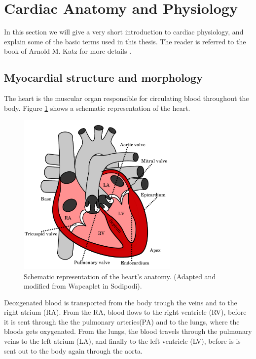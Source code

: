 \section{Cardiac Anatomy and Physiology}
\label{sec:intro_physiology}
In this section we will give a very short introduction to cardiac
physiology, and explain some of the basic terms used in this
thesis. The reader is referred to the book of Arnold M. Katz for 
more details \cite{katz2010physiology}.


\subsection{Myocardial structure and morphology}
The heart is the muscular organ responsible for circulating blood
throughout the body. Figure \ref{fig:heart_anatomy} shows a schematic
representation of the heart. 


\begin{figure}[htbp]
  \centering
    \includegraphics[width=0.7\textwidth]{chapters/introduction/figures/heart_anatomy.pdf}
\caption{Schematic representation of the heart's anatomy. (Adapted and modified from Wapcaplet in Sodipodi).}
\label{fig:heart_anatomy}
\end{figure}


Deoxgenated blood is transported from the body trough the veins and to
the right atrium (RA). From the RA, blood flows to the right ventricle
(RV), before it is sent through the the pulmonary arteries(PA) and to the
lungs, where the bloods gets oxygenated. From the lungs, the blood
travels through the pulmonary veins to the left atrium (LA), and
finally to the left ventricle (LV), before is is sent out to the body
again through the aorta.

